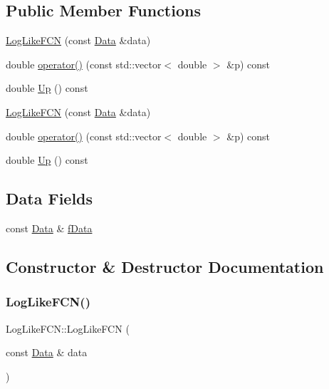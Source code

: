 \subsection*{Public Member Functions}
\begin{DoxyCompactItemize}
\item 
\mbox{\hyperlink{structLogLikeFCN_a45401253d941b65211285bef93b74c59}{Log\+Like\+F\+CN}} (const \mbox{\hyperlink{adat-devel_2other__libs_2minuit_2test_2MnSim_2ParallelTest_8cxx_a1766b42441c3f4d78bb2b56263a8e058}{Data}} \&data)
\item 
double \mbox{\hyperlink{structLogLikeFCN_a22d42d405147ecea23ab7b3a61003179}{operator()}} (const std\+::vector$<$ double $>$ \&p) const
\item 
double \mbox{\hyperlink{structLogLikeFCN_ace81f647c3b49597fdfa5a9ff88e56d4}{Up}} () const
\item 
\mbox{\hyperlink{structLogLikeFCN_a45401253d941b65211285bef93b74c59}{Log\+Like\+F\+CN}} (const \mbox{\hyperlink{adat-devel_2other__libs_2minuit_2test_2MnSim_2ParallelTest_8cxx_a1766b42441c3f4d78bb2b56263a8e058}{Data}} \&data)
\item 
double \mbox{\hyperlink{structLogLikeFCN_a22d42d405147ecea23ab7b3a61003179}{operator()}} (const std\+::vector$<$ double $>$ \&p) const
\item 
double \mbox{\hyperlink{structLogLikeFCN_ace81f647c3b49597fdfa5a9ff88e56d4}{Up}} () const
\end{DoxyCompactItemize}
\subsection*{Data Fields}
\begin{DoxyCompactItemize}
\item 
const \mbox{\hyperlink{adat-devel_2other__libs_2minuit_2test_2MnSim_2ParallelTest_8cxx_a1766b42441c3f4d78bb2b56263a8e058}{Data}} \& \mbox{\hyperlink{structLogLikeFCN_a1e75701ec502db469acee1c5d2d83a45}{f\+Data}}
\end{DoxyCompactItemize}


\subsection{Constructor \& Destructor Documentation}
\mbox{\label{structLogLikeFCN_a45401253d941b65211285bef93b74c59}} 
\subsubsection{\texorpdfstring{LogLikeFCN()}{LogLikeFCN()}\hspace{0.1cm}{\footnotesize\ttfamily [1/2]}}
{\footnotesize\ttfamily Log\+Like\+F\+C\+N\+::\+Log\+Like\+F\+CN (\begin{DoxyParamCaption}\item[{const \mbox{\hyperlink{adat-devel_2other__libs_2minuit_2test_2MnSim_2ParallelTest_8cxx_a1766b42441c3f4d78bb2b56263a8e058}{Data}} \&}]{data }\end{DoxyParamCaption})\hspace{0.3cm}{\ttfamily [inline]}}


